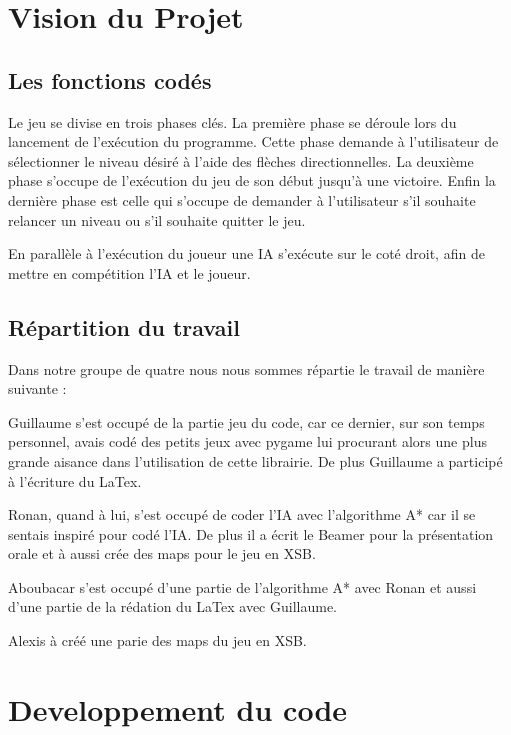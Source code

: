 \documentclass[a4paper,12pt]{article} %
\begin{document}
\newpage

\section{Vision du Projet}

\subsection{Les fonctions codés}

Le jeu se divise en trois phases clés.
La première phase se déroule lors du lancement de l'exécution du programme.
Cette phase demande à l'utilisateur de sélectionner le niveau désiré à l'aide des flèches directionnelles.
La deuxième phase s'occupe de l'exécution du jeu de son début jusqu'à une victoire.
Enfin la dernière phase est celle qui s'occupe de demander à l'utilisateur s'il souhaite relancer un niveau ou s'il souhaite quitter le jeu.

En parallèle à l'exécution du joueur une IA s'exécute  sur le coté droit, afin de mettre en compétition l'IA et le joueur.

\subsection{Répartition du travail}

Dans notre groupe de quatre nous nous sommes répartie le travail de manière suivante : 

Guillaume s'est occupé de la partie jeu du code, car ce dernier, sur son temps personnel, avais codé des petits jeux avec pygame lui procurant alors une plus grande aisance dans l'utilisation de cette librairie.
De plus Guillaume a participé à l'écriture du LaTex.

Ronan, quand à lui, s'est occupé de coder l'IA avec l'algorithme A* car il se sentais inspiré pour codé l'IA.
De plus il a écrit le Beamer pour la présentation orale et à aussi crée des maps pour le jeu en XSB.

Aboubacar s'est occupé d'une partie de l'algorithme A* avec Ronan et aussi d'une partie de la rédation du LaTex avec Guillaume.

Alexis à créé une parie des maps du jeu en XSB.

\newpage

\section{Developpement du code}
\end{document}
